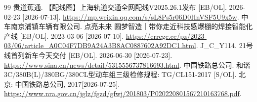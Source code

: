 
\begin{flushleft}
  \begin{small}
    \begin{thebibliography}{99}
      \setlength{\itemsep}{0pt}
      \setlength{\parsep}{0pt}
       贵道蕉通. 【配线图】上海轨道交通全网配线V2025.26.1发布 [EB/OL]. 2026-02-23 [2026-07-13].
      \href{https://mp.weixin.qq.com/s/sL8Ps5r06D0HnVSF5U9x5w}{\color{blue} https://mp.weixin.qq.com/s/sL8Ps5r06D0HnVSF5U9x5w}.
       中车南京浦镇车辆有限公司. 点亮未来 圆梦智造｜带你走近科技感爆棚的焊接智能化产线 [EB/OL]. 2023-03-06 [2026-07-10].
      \href{https://crrcgc.cc/pz/2023-03/06/article\_A0C04F7DB9A24A3B8AC0887602A92DC1.html}{\color{blue} https://crrcgc.cc/pz/2023-03/06/article\_A0C04F7DB9A24A3B8AC0887602A92DC1.html}.
       J\_C\_Y114. 21号线首列新车今天交付 [EB/OL]. 2026-06-30 [2026-07-23].
      \href{https://www.sina.cn/news/detail/5315556737816693.html}{\color{blue} https://www.sina.cn/news/detail/5315556737816693.html}.
       中国铁路总公司. 和谐3C/380B{(L)}/380BG/380CL型动车组三级检修规程: TG/CL151-2017 [S/OL]. 北京: 中国铁路总公司, 2017[2026-07-25].
      \href{https://www.nra.gov.cn/jglz/fgzd/gfwj/201803/P020220801567210163768.pdf}{\color{blue} https://www.nra.gov.cn/jglz/fgzd/gfwj/201803/P020220801567210163768.pdf}.
    \end{thebibliography}
  \end{small}
\end{flushleft}

